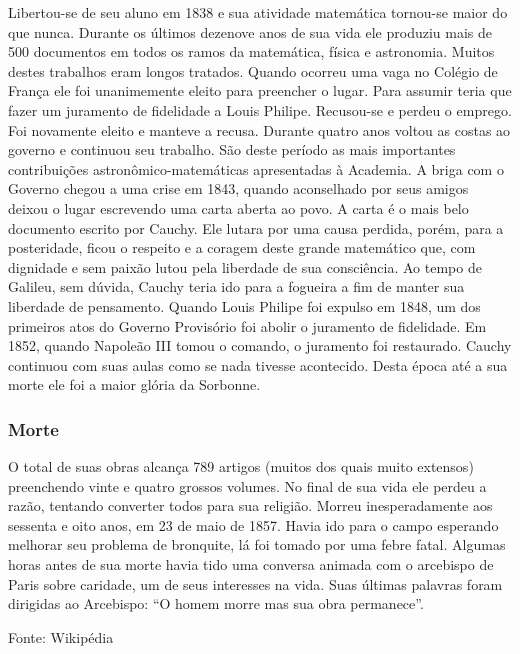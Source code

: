 Libertou-se de seu aluno em 1838 e sua atividade matemática tornou-se maior do que nunca. Durante os últimos dezenove anos de sua vida ele produziu mais de 500 documentos em todos os ramos da matemática, física e astronomia. Muitos destes trabalhos eram longos tratados. Quando ocorreu uma vaga no Colégio de França ele foi unanimemente eleito para preencher o lugar. Para assumir teria que fazer um juramento de fidelidade a Louis Philipe. Recusou-se e perdeu o emprego. Foi novamente eleito e manteve a recusa. Durante quatro anos voltou as costas ao governo e continuou seu trabalho. São deste período as mais importantes contribuições astronômico-matemáticas apresentadas à Academia. A briga com o Governo chegou a uma crise em 1843, quando aconselhado por seus amigos deixou o lugar escrevendo uma carta aberta ao povo. A carta é o mais belo documento escrito por Cauchy. Ele lutara por uma causa perdida, porém, para a posteridade, ficou o respeito e a coragem deste grande matemático que, com dignidade e sem paixão lutou pela liberdade de sua consciência. Ao tempo de Galileu, sem dúvida, Cauchy teria ido para a fogueira a fim de manter sua liberdade de pensamento. Quando Louis Philipe foi expulso em 1848, um dos primeiros atos do Governo Provisório foi abolir o juramento de fidelidade. Em 1852, quando Napoleão III tomou o comando, o juramento foi restaurado. Cauchy continuou com suas aulas como se nada tivesse acontecido. Desta época até a sua morte ele foi a maior glória da Sorbonne.

\subsubsection{Morte}

O total de suas obras alcança 789 artigos (muitos dos quais muito extensos) preenchendo vinte e quatro grossos volumes. No final de sua vida ele perdeu a razão, tentando converter todos para sua religião. Morreu inesperadamente aos sessenta e oito anos, em 23 de maio de 1857. Havia ido para o campo esperando melhorar seu problema de bronquite, lá foi tomado por uma febre fatal. Algumas horas antes de sua morte havia tido uma conversa animada com o arcebispo de Paris sobre caridade, um de seus interesses na vida. Suas últimas palavras foram dirigidas ao Arcebispo: ``O homem morre mas sua obra permanece''.

Fonte: Wikipédia






